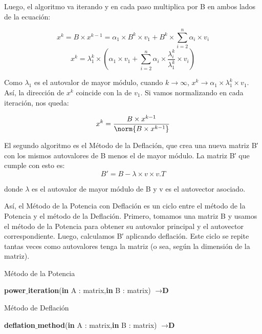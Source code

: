 Luego, el algoritmo va iterando y en cada paso multiplica por B en ambos lados de la ecuación:

\[ 
x^{k} = B \times x^{k-1} = \alpha_{1} \times B^{k} \times v_{1} + B^{k} \times \sum_{i=2}^{n} \alpha_{i} \times v_{i} 
\]
\[ 
x^{k} = \lambda_{1}^{k} \times (\alpha_{1} \times v_{1} + \sum_{i=2}^{n} \alpha_{i} \times \frac{\lambda_{i}^{k}}{\lambda_{1}^{k}} \times v_{i})
\]

Como $\lambda_{1}$ es el autovalor de mayor módulo, cuando $k \rightarrow \infty$, $x^{k} \rightarrow \alpha_{1} \times \lambda_{1}^{k} \times v_{1}$. Así, la dirección de $x^{k}$ coincide con la de $v_{1}$. Si vamos normalizando en cada iteración, nos queda:

\[ 
x^{k} = \frac{B \times x^{k-1}}{\norm{B \times x^{k-1}}}
\]


El segundo algoritmo es el Método de la Deflación, que crea una nueva matriz B′ con los mismos autovalores de B menos el de mayor módulo. La matriz B′ que cumple con esto es:
\[
B' = B - \lambda \times v \times v.T 
\]

donde $\lambda$ es el autovalor de mayor módulo de B y v es el autovector asociado.

Así, el Método de la Potencia con Deflación es un ciclo entre el método de la Potencia y el método de la Deflación. Primero, tomamos una matriz B y usamos el método de la Potencia para obtener su autovalor principal y el autovector correspondiente. Luego, calculamos B′ aplicando deflación. Este ciclo se repite tantas veces como autovalores tenga la matriz (o sea, según la dimensión de la matriz).

\begin{algorithm}
\caption{Método de la Potencia}\label{power_algo}
\begin{algorithmic}
\State \textbf{power$\_$iteration}(\textbf{in} A : matrix,\textbf{in} B : matrix) $\to \textbf{D}$

\end{algorithmic}
\end{algorithm}

\begin{algorithm}
\caption{Método de Deflación}\label{def_algo}
\begin{algorithmic}
\State \textbf{deflation$\_$method}(\textbf{in} A : matrix,\textbf{in} B : matrix) $\to \textbf{D}$

\end{algorithmic}
\end{algorithm}


